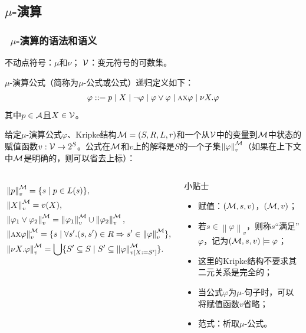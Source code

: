 \documentclass[9pt, CJK]{beamer}
\begin{document}
\subsection{$\mu$-演算}
\begin{frame} 
	\frametitle{~$\mu$-演算的语法和语义}
	{\footnotesize 
		不动点符号：$\mu$和$\nu$；\qquad
		 	${\cal V}$：变元符号的可数集。
		
	\begin{definition}[$\mu$-演算公式]
		$\mu$-演算公式（简称为$\mu$-公式或公式）递归定义如下：
		\[
		\varphi ::=   p\mid  X\mid \neg \varphi\mid \varphi \vee \varphi \mid \textsc{a}\textsc{x} \varphi\mid  \nu X. \varphi
		\]
		其中$p\in {\cal A}$且$X\in {\cal V}$。
	\end{definition}
\begin{definition}
	给定$\mu$-演算公式$\varphi$、Kripke结构{\em ${\cal M}=(S,R,L,r)$}和一个从${\cal V}$中的变量到${\cal M}$中状态的赋值函数$v: {\cal V} \rightarrow 2^S$。公式在${\cal M}$和$v$上的解释是$S$的一个子集$\left\| \varphi\right\|_v^{{\cal M}}$（如果在上下文中${\cal M}$是明确的，则可以省去上标）：
	\begin{columns}
		\begin{align*}
			& \left \| p\right \|_v^{{\cal M}} = \{s\mid p \in L(s)\}, \\  
			& \left\| X\right\|_v^{{\cal M}} = v(X),\\
			& \left\|\varphi_1 \vee \varphi_2\right\|_v^{{\cal M}} = \left\|\varphi_1\right\|_v^{{\cal M}} \cup \left\|\varphi_2\right\|_v^{{\cal M}},\\ 
			& \left\|\textsc{a} \textsc{x} \varphi\right\|_v^{{\cal M}} = \{s\mid \forall s'. (s, s') \in R \Rightarrow s' \in \left\|\varphi\right\|_v^{{\cal M}}\},\\ 
			& \left\| \nu X. \varphi\right\|_v^{{\cal M}} = \bigcup\{S' \subseteq S \mid S' \subseteq \left\|\varphi\right\|_{v[X:= S']}^{{\cal M}}\}.
		\end{align*}
	 {\tiny 
	 	\begin{block}{{\scriptsize 小贴士}}
	 		\begin{itemize} 
	 			\item 赋值：$({\cal M},s,v)$，$({\cal M},v)$；
	 			\item 若$s\in \left\| \varphi \right\|_v$，则称$s$“满足”$\varphi$，记为$({\cal M}, s, v) \models \varphi$；
	 			\item 这里的Kripke结构不要求其二元关系是完全的；
	 			\item 当公式$\varphi$为$\mu$-句子时，可以将赋值函数$v$省略；
	 			\item 范式：析取$\mu$-公式。
	 		\end{itemize}
	 	\end{block}
	 	} 
	\end{columns}
	

\end{definition}}
\end{frame}
\end{document}
